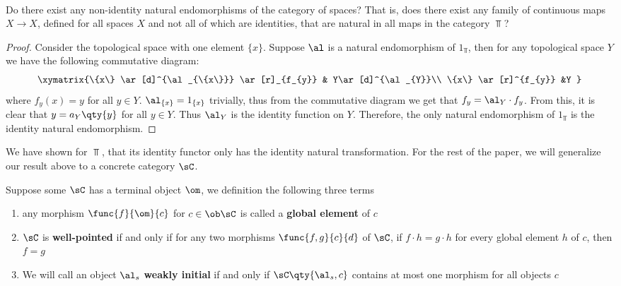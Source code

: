 \documentclass[main.tex]{subfiles}
\begin{document}
\paragraph{}
\begin{exercise}
	Do there exist any non-identity natural endomorphisms of the category of
	spaces? That is, does there exist any family of continuous maps
	$X\rightarrow X$, defined for all spaces $X$ and not all of which are
	identities, that are natural in all maps in the category $\Top$?
\end{exercise}

\begin{proof}
	Consider the topological space with one element $\{x\}$. Suppose $\al$ is a
	natural endomorphism of $1_{\Top}$, then for any topological space $Y$ we
	have the following commutative diagram:
	\[\xymatrix{\{x\} \ar[d]^{\al_{\{x\}}} \ar[r]_{f_{y}} & Y\ar[d]^{\al_{Y}}\\
	\{x\} \ar[r]^{f_{y}} &Y  }\] where $f_{y}(x) = y$ for all $y \in Y$.
	$\al_{\{x\}} = 1_{\{x\}}$ trivially, thus from the commutative diagram we
	get that $f_{y} = \al_{Y}\cdot f_{y}$. From this, it is clear that $y =
	a_{Y}\qty{y}$ for all $y \in Y$. Thus $\al_{Y}$ is the identity function on
	$Y$. Therefore, the only natural endomorphism of $1_{\Top}$ is the identity
	natural endomorphism.
\end{proof}

We have shown for $\Top$, that its identity functor only has the identity
natural transformation. For the rest of the paper, we will generalize our result
above to a concrete category $\sC$.

\begin{definition}
	Suppose some $\sC$ has a terminal object $\om$, we definition the following
	three terms
	\begin{enumerate}
		\item any morphism $\func{f}{\om}{c}$ for $c \in \ob \sC$ is called a
			{\bf global element} of $c$
		\item $\sC$ is {\bf well-pointed} if and only if for any two morphisms
			$\func{f,g}{c}{d}$ of $\sC$, if $f \cdot h = g \cdot h$ for every
			global element $h$ of $c$, then $f = g$
		\item We will call an object $\al_{s}$ {\bf weakly initial} if and only
			if $\sC\qty{\al_{s},c}$ contains at most one morphism for all
			objects $c$
	\end{enumerate}
\end{definition}
\end{document}
